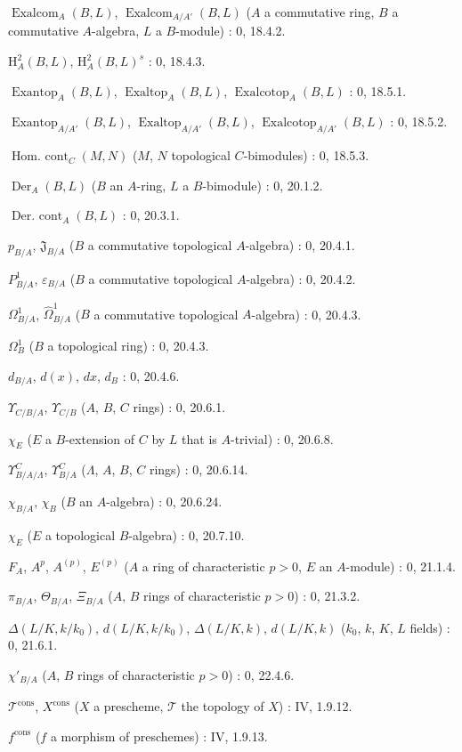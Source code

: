 $\operatorname{Exalcom}_A(B,L)$, $\operatorname{Exalcom}_{A/A'}(B,L)$ ($A$ a commutative ring, $B$ a commutative $A$-algebra, $L$ a $B$-module) : 0, 18.4.2.\par
$\mathrm H_A^2(B,L)$, $\mathrm H_A^2(B,L)^s$ : 0, 18.4.3.\par
$\operatorname{Exantop}_A(B,L)$, $\operatorname{Exaltop}_A(B,L)$,
$\operatorname{Exalcotop}_A(B,L)$ : 0, 18.5.1.\par
$\operatorname{Exantop}_{A/A'}(B,L)$, $\operatorname{Exaltop}_{A/A'}(B,L)$,
$\operatorname{Exalcotop}_{A/A'}(B,L)$ : 0, 18.5.2.\par
$\operatorname{Hom.\ cont}_C(M,N)$ ($M$, $N$ topological $C$-bimodules) : 0, 18.5.3.\par
$\operatorname{Der}_A(B,L)$ ($B$ an $A$-ring, $L$ a $B$-bimodule) : 0, 20.1.2.\par
$\operatorname{Der.\ cont}_A(B,L)$ : 0, 20.3.1.\par
$p_{B/A}$, $\mathfrak J_{B/A}$ ($B$ a commutative topological $A$-algebra) : 0, 20.4.1.\par
$P^1_{B/A}$, $\varepsilon_{B/A}$ ($B$ a commutative topological $A$-algebra) : 0, 20.4.2.\par
$\Omega^1_{B/A}$, $\widehat{\Omega}^1_{B/A}$ ($B$ a commutative topological $A$-algebra) : 0, 20.4.3.\par
$\Omega^1_B$ ($B$ a topological ring) : 0, 20.4.3.\par
$d_{B/A}$, $d(x)$, $dx$, $d_B$ : 0, 20.4.6.\par
$\Upsilon_{C/B/A}$, $\Upsilon_{C/B}$ ($A$, $B$, $C$ rings) : 0, 20.6.1.\par
$\chi_E$ ($E$ a $B$-extension of $C$ by $L$ that is $A$-trivial) : 0, 20.6.8.\par

\clearpage
{}
$\Upsilon^C_{B/A/\Lambda}$, $\Upsilon^C_{B/A}$ ($\Lambda$, $A$, $B$, $C$ rings) : 0, 20.6.14.\par
$\chi_{B/A}$, $\chi_B$ ($B$ an $A$-algebra) : 0, 20.6.24.\par
$\chi_E$ ($E$ a topological $B$-algebra) : 0, 20.7.10.\par
$F_A$, $A^p$, $A^{(p)}$, $E^{(p)}$ ($A$ a ring of characteristic $p>0$, $E$ an $A$-module) : 0, 21.1.4.\par
$\pi_{B/A}$, $\Theta_{B/A}$, $\Xi_{B/A}$ ($A$, $B$ rings of characteristic $p>0$) : 0, 21.3.2.\par
$\Delta(L/K,k/k_0)$, $d(L/K,k/k_0)$, $\Delta(L/K,k)$, $d(L/K,k)$ ($k_0$, $k$, $K$, $L$ fields) : 0, 21.6.1.\par
$\chi'_{B/A}$ ($A$, $B$ rings of characteristic $p>0$) : 0, 22.4.6.\par
$\mathscr T^{\mathrm{cons}}$, $X^{\mathrm{cons}}$ ($X$ a prescheme, $\mathscr T$ the topology of $X$) : IV, 1.9.12.\par
$f^{\mathrm{cons}}$ ($f$ a morphism of preschemes) : IV, 1.9.13.\par

